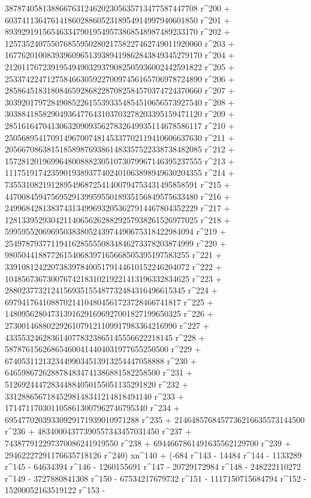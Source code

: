        3878740581388667631246202305635713477587447708 r^200 + 
       6037411364761418602886052318954914997940601850 r^201 + 
       8939291915654633479019549573868548987489233170 r^202 + 
       12573524075507685595028021758227462749011920060 r^203 + 
       16776201008393960965139389419862843849345279170 r^204 + 
       21201176723919549490329379082505936002442591822 r^205 + 
       25337422471275846630592270097456165706978724890 r^206 + 
       28586451831808465928682287082584570374724370660 r^207 + 
       30392017972849085226155393354854510656573927540 r^208 + 
       30388418582904936477643103703278203395159471120 r^209 + 
       28516164704130632090935627832649935114678586117 r^210 + 
       25056895417091496700748145337702119410606637630 r^211 + 
       20566708638151858987693861483357522338738482085 r^212 + 
       15728120196996480088823051073079967146395237555 r^213 + 
       11175191742359019389377402401063898949630204355 r^214 + 
       7355310821912895496872541400794753431495858591 r^215 + 
       4470084594756952913995955018935156849575633480 r^216 + 
       2499684281383743134996932053627914467804352229 r^217 + 
       1281339529304211406562628829257938261526977025 r^218 + 
       599595520696950383805243974490675318422984094 r^219 + 
       254978793771194162855550834846273378203874999 r^220 + 
       98050441887726154068397165668505395197583255 r^221 + 
       33910812422073839784005179144610152246204072 r^222 + 
       10485673673007674218310219221413196332834625 r^223 + 
       2880237732124156935155487732484316496615345 r^224 + 
       697941764108870214104804561723728466741817 r^225 + 
       148095628047313916291696927001827199650325 r^226 + 
       27300146880229261079121109917983364216990 r^227 + 
       4335532462836140778323865145556622218145 r^228 + 
       587876156268654600414404031977655250500 r^229 + 
       67405311213234499034513913254447058888 r^230 + 
       6465986726288784834741386881582258500 r^231 + 
       512692444728344884050155051135291820 r^232 + 
       33128865671845298148341214818494140 r^233 + 
       1714711703011058613007962746795340 r^234 + 
       69547702039330929171939010971288 r^235 + 
       2146485768457736216635573144500 r^236 + 
       48340004377390557343457031450 r^237 + 
       743877912297370086241919550 r^238 + 
       6944667861491635562129700 r^239 + 
       29462227291176635718126 r^240) xn^140 + (-684 r^143 - 
       14484 r^144 - 1133289 r^145 - 64634394 r^146 - 
       1260155691 r^147 - 20729172984 r^148 - 248222110272 r^149 - 
       3727880841308 r^150 - 67534217679732 r^151 - 
       1117150715684794 r^152 - 15200052163519122 r^153 - 
